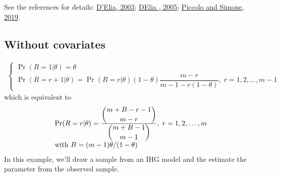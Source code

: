\documentclass[letterpaper,10pt,english]{sphinxmanual}
\begin{document}
\sphinxAtStartPar
See the references for details: \hyperlink{cite.references:id17}{D’Elia, 2003}; \hyperlink{cite.references:id18}{D\textquotesingle{}Elia , 2005};
\hyperlink{cite.references:id3}{Piccolo and Simone, 2019}.


\subsection{Without covariates}
\label{\detokenize{manual:ihg-without-covariates}}\label{\detokenize{manual:id36}}
\sphinxAtStartPar
{}
\begin{equation*}
\begin{split}\left\{
\begin{array}{l}
    \Pr(R=1|\theta) = \theta
    \\
    \Pr(R=r+1|\theta) = \Pr(R=r|\theta)(1-\theta)\dfrac{m-r}{m-1-r(1-\theta)},\; r= 1,2, \ldots, m-1
\end{array}
\right.\end{split}
\end{equation*}
\sphinxAtStartPar
which is equivalent to
\begin{equation*}
\begin{split}\begin{array}{l}
\Pr(R=r|\theta) = \frac{ \dbinom{m+B-r-1}{m-r} }{ \dbinom{m+B-1}{m-1} },\; r= 1,2, \ldots, m
\\
\textrm{with } B = (m-1)\theta / (1 - \theta)
\end{array}\end{split}
\end{equation*}
\sphinxAtStartPar
In this example, we’ll draw a sample from an IHG model
and the estimate the parameter from the observed sample.
\end{document}
